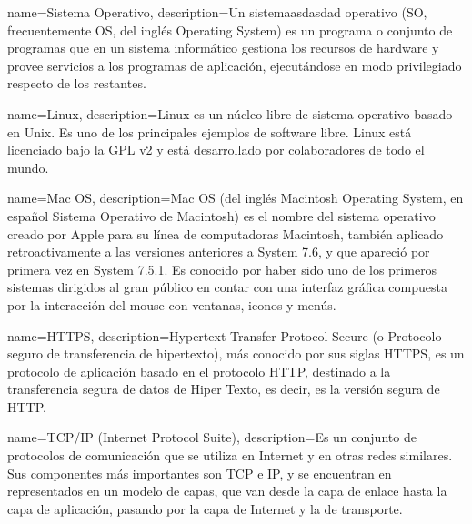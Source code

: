 {name=Sistema Operativo,
description={Un sistemaasdasdad operativo (SO, frecuentemente OS, del inglés Operating System) es un programa o conjunto de programas que en un sistema informático gestiona los recursos de hardware y provee servicios a los programas de aplicación, ejecutándose en modo privilegiado respecto de los restantes.}
}

{name=Linux,
description={Linux es un núcleo libre de sistema operativo basado en Unix. Es uno de los principales ejemplos de software libre. Linux está licenciado bajo la GPL v2 y está desarrollado por colaboradores de todo el mundo.}
}

{name=Mac OS,
description={Mac OS (del inglés Macintosh Operating System, en español Sistema Operativo de Macintosh) es el nombre del sistema operativo creado por Apple para su línea de computadoras Macintosh, también aplicado retroactivamente a las versiones anteriores a System 7.6, y que apareció por primera vez en System 7.5.1. Es conocido por haber sido uno de los primeros sistemas dirigidos al gran público en contar con una interfaz gráfica compuesta por la interacción del mouse con ventanas, iconos y menús.}
}

{name=HTTPS,
description={Hypertext Transfer Protocol Secure (o Protocolo seguro de transferencia de hipertexto), más conocido por sus siglas HTTPS, es un protocolo de aplicación basado en el protocolo HTTP, destinado a la transferencia segura de datos de Hiper Texto, es decir, es la versión segura de HTTP.}
}

{name=TCP/IP (Internet Protocol Suite),
description={Es un conjunto de protocolos de comunicación que se utiliza en Internet y en otras redes similares. Sus componentes más importantes son TCP e IP, y se encuentran en representados en un modelo de capas, que van desde la capa de enlace hasta la capa de aplicación, pasando por la capa de Internet y la de transporte.}
}